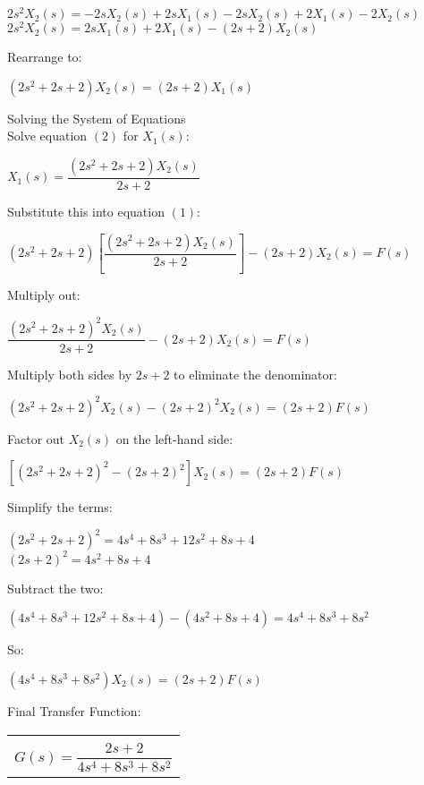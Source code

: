\documentclass[11pt,letterpaper]{article}
\begin{document}
\begin{center}
	$2s^2X_2(s)=-2sX_2(s)+2sX_1(s)-2sX_2(s)+2X_1(s)-2X_2(s)$\\[12pt]
	$2s^2X_2(s)=2sX_1(s)+2X_1(s)-(2s+2)X_2(s)$\\[12pt]
\end{center}
Rearrange to:\\
\begin{center}
	$(2s^2+2s+2)X_2(s)=(2s+2)X_1(s)$\\
\end{center}
Solving the System of Equations\\[12pt]
Solve equation $(2)$ for $X_1(s)$:\\
\begin{center}
	$X_1(s)=\dfrac{(2s^2+2s+2)X_2(s)}{2s+2}$\\
\end{center}
Substitute this into equation $(1)$:\\
\begin{center}
	$(2s^2+2s+2)\left[\dfrac{(2s^2+2s+2)X_2(s)}{2s+2}\right]-(2s+2)X_2(s)=F(s)$\\
\end{center}
Multiply out:\\
\begin{center}
	$\dfrac{(2s^2+2s+2)^2X_2(s)}{2s+2}-(2s+2)X_2(s)=F(s)$\\
\end{center}
Multiply both sides by $2s + 2$ to eliminate the denominator:\\
\begin{center}
	$(2s^2+2s+2)^2X_2(s)-(2s+2)^2X_2(s)=(2s+2)F(s)$\\
\end{center}
Factor out $X_2(s)$ on the left-hand side:\\
\begin{center}
	$[(2s^2+2s+2)^2-(2s+2)^2]X_2(s)=(2s+2)F(s)$\\
\end{center}
Simplify the terms:\\
\begin{center}
	$(2s^2+2s+2)^2=4s^4+8s^3+12s^2+8s+4$\\[12pt]
	$(2s+2)^2=4s^2+8s+4$\\
\end{center}
Subtract the two:\\
\begin{center}
	$(4s^4+8s^3+12s^2+8s+4)-(4s^2+8s+4)=4s^4+8s^3+8s^2$\\
\end{center}
So:\\
\begin{center}
	$(4s^4+8s^3+8s^2)X_2(s)=(2s+2)F(s)$\\
\end{center}
Final Transfer Function:\\
\begin{center}
	\begin{tabular}{|c|}
		\hline \\
		$G(s)=\dfrac{2s+2}{4s^4+8s^3+8s^2}$	\\ [12pt]
	\hline
	\end{tabular}	
\end{center}
\end{document}
